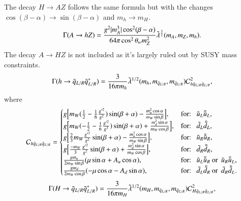 \documentclass[final,3p,times]{elsarticle}
\begin{document}
The decay $H \rightarrow AZ$ follows the same formula but with the changes $\cos(\beta - \alpha) \rightarrow \sin(\beta - \alpha)$ and $m_h \rightarrow m_H$.
\begin{equation}\label{AhZ}
\Gamma (A \rightarrow h Z) = {g^2 |m_A^3| \cos^2 (\beta -\alpha) \over 64\pi \cos^2 \theta_w m_{Z}^2} \tilde{\lambda}^{3 \over 2} (m_A,m_Z, m_h).
\end{equation} 
The decay $A \rightarrow HZ$ is not included as it's largely ruled out by SUSY mass constraints.
\begin{equation}\label{hqLRqLR}
\Gamma(h \rightarrow \tilde{q}_{L/R} \tilde{q}_{L/R}^*) = {3 \over 16 \pi m_h} \tilde{\lambda}^{1/2}(m_h,m_{\tilde{q}_{L/R}},m_{\tilde{q}_{L/R}}) \mathcal{C}_{h \tilde{q}_{L/R} \tilde{q}_{L/R}}^2,
\end{equation} 
where
\begin{equation}
\mathcal{C}_{h \tilde{q}_{L/R} \tilde{q}_{L/R}} = \begin{cases}
			g\Big[m_W ({1 \over 2} - {1 \over 6}{g'^2 \over g^2} )\sin(\beta+\alpha) - {m_{u}^2 \cos \alpha \over m_W \sin \beta}\Big], & $for: $\: \: \tilde{u}_L\bar{\tilde{u}}_L, \\
			g\Big[m_W (-{1 \over 2} - {1 \over 6}{g'^2 \over g^2} )\sin(\beta+\alpha) + {m_{d}^2 \sin \alpha \over m_W \cos \beta}\Big], & $for: $ \: \: \tilde{d}_L\bar{\tilde{d}}_L, \\
			g\Big[{2 \over 3}m_W{g'^2 \over g^2}\sin(\beta+\alpha) - {m_{u}^2 \cos \alpha \over m_W \sin \beta}\Big], & $for: $ \: \: \tilde{u}_R\bar{\tilde{u}}_R, \\
			g\Big[{-m_W \over 3}{g'^2 \over g^2}\sin(\beta+\alpha) + {m_{d}^2 \sin \alpha \over m_W \cos \beta}\Big], & $for: $ \: \: \tilde{d}_R\bar{\tilde{d}}_R, \\
			{g m_{u} \over 2 m_{W} \sin\beta}(\mu \sin\alpha + A_{u}\cos\alpha), & $for: $ \: \: \tilde{u}_L \bar{\tilde{u}}_R \: $or $\: \tilde{u}_R \bar{\tilde{u}}_L, \\ 
			{g m_{d} \over 2 m_{W} \cos\beta}(-\mu \cos\alpha - A_{d}\sin\alpha), & $for: $ \: \: \tilde{d}_L \bar{\tilde{d}}_R \: $or $\: \tilde{d}_R \bar{\tilde{d}}_L.\\
			\end{cases}
\end{equation}
\begin{equation}\label{HqLRqLR}
\Gamma(H \rightarrow \tilde{q}_{L/R} \tilde{q}_{L/R}^*) = {3 \over 16 \pi m_H} \tilde{\lambda}^{1/2}(m_{H},m_{\tilde{q}_{L/R}}, m_{\tilde{q}_{L/R}}) \mathcal{C}_{H \tilde{q}_{L/R} \tilde{q}_{L/R}}^2,
\end{equation} 
\end{document}
